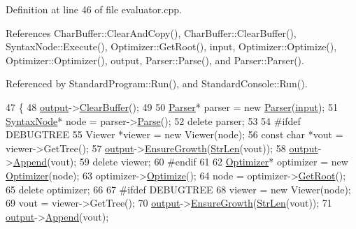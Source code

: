 Definition at line 46 of file evaluator.\+cpp.



References Char\+Buffer\+::\+Clear\+And\+Copy(), Char\+Buffer\+::\+Clear\+Buffer(), Syntax\+Node\+::\+Execute(), Optimizer\+::\+Get\+Root(), input, Optimizer\+::\+Optimize(), Optimizer\+::\+Optimizer(), output, Parser\+::\+Parse(), and Parser\+::\+Parser().



Referenced by Standard\+Program\+::\+Run(), and Standard\+Console\+::\+Run().


\begin{DoxyCode}
47 \{
48     \hyperlink{classEvaluator_a35018fd9dd13289a6dbf967cd1acd13c}{output}->\hyperlink{classCharBuffer_a0bcdd5708db4b04c887224e83a05086f}{ClearBuffer}();
49 
50     \hyperlink{classParser}{Parser}* parser = \textcolor{keyword}{new} \hyperlink{classParser}{Parser}(\hyperlink{classEvaluator_a13bf216912227688690b87072bffcd59}{input});
51     \hyperlink{classSyntaxNode}{SyntaxNode}* node = parser->\hyperlink{classParser_a1861d1d9cc6165970cf07e07cacd11df}{Parse}();
52     \textcolor{keyword}{delete} parser;
53 
54 \textcolor{preprocessor}{#ifdef DEBUGTREE}
55     Viewer *viewer = \textcolor{keyword}{new} Viewer(node);
56     \textcolor{keyword}{const} \textcolor{keywordtype}{char} *vout = viewer->GetTree();
57     \hyperlink{classEvaluator_a35018fd9dd13289a6dbf967cd1acd13c}{output}->\hyperlink{classCharBuffer_a73c71d361110b37819a1d681a1504b0e}{EnsureGrowth}(\hyperlink{clib_8h_a67ec56eb98b49515d35005a5b3bf9a32}{StrLen}(vout));
58     \hyperlink{classEvaluator_a35018fd9dd13289a6dbf967cd1acd13c}{output}->\hyperlink{classCharBuffer_a045b38735f7b3007c1b98d3d7b7feafe}{Append}(vout);
59     \textcolor{keyword}{delete} viewer;
60 \textcolor{preprocessor}{#endif}
61 
62     \hyperlink{classOptimizer}{Optimizer}* optimizer = \textcolor{keyword}{new} \hyperlink{classOptimizer}{Optimizer}(node);
63     optimizer->\hyperlink{classOptimizer_a5764ae0825fa43921f74d8b972e53b1e}{Optimize}();
64     node = optimizer->\hyperlink{classOptimizer_ae50ae3a88ea8f5161b9bb072ccf4ea93}{GetRoot}();
65     \textcolor{keyword}{delete} optimizer;
66 
67 \textcolor{preprocessor}{#ifdef DEBUGTREE}
68     viewer = \textcolor{keyword}{new} Viewer(node);
69     vout = viewer->GetTree();
70     \hyperlink{classEvaluator_a35018fd9dd13289a6dbf967cd1acd13c}{output}->\hyperlink{classCharBuffer_a73c71d361110b37819a1d681a1504b0e}{EnsureGrowth}(\hyperlink{clib_8h_a67ec56eb98b49515d35005a5b3bf9a32}{StrLen}(vout));
71     \hyperlink{classEvaluator_a35018fd9dd13289a6dbf967cd1acd13c}{output}->\hyperlink{classCharBuffer_a045b38735f7b3007c1b98d3d7b7feafe}{Append}(vout);

\end{DoxyCode}
